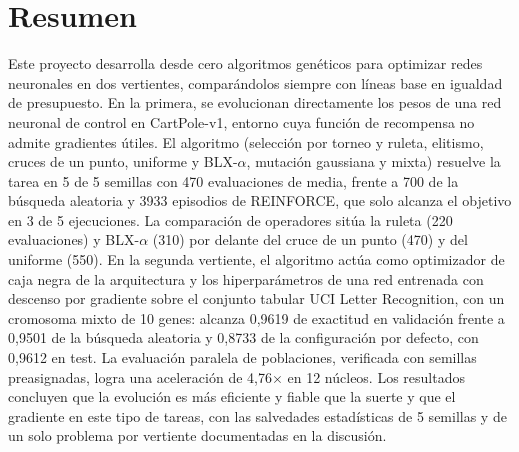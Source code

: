 \section{Resumen}

Este proyecto desarrolla desde cero algoritmos genéticos para optimizar redes neuronales en dos vertientes, comparándolos siempre con líneas base en igualdad de presupuesto. En la primera, se evolucionan directamente los pesos de una red neuronal de control en CartPole-v1, entorno cuya función de recompensa no admite gradientes útiles. El algoritmo (selección por torneo y ruleta, elitismo, cruces de un punto, uniforme y BLX-$\alpha$, mutación gaussiana y mixta) resuelve la tarea en 5 de 5 semillas con 470 evaluaciones de media, frente a 700 de la búsqueda aleatoria y 3933 episodios de REINFORCE, que solo alcanza el objetivo en 3 de 5 ejecuciones. La comparación de operadores sitúa la ruleta (220 evaluaciones) y BLX-$\alpha$ (310) por delante del cruce de un punto (470) y del uniforme (550). En la segunda vertiente, el algoritmo actúa como optimizador de caja negra de la arquitectura y los hiperparámetros de una red entrenada con descenso por gradiente sobre el conjunto tabular UCI Letter Recognition, con un cromosoma mixto de 10 genes: alcanza 0,9619 de exactitud en validación frente a 0,9501 de la búsqueda aleatoria y 0,8733 de la configuración por defecto, con 0,9612 en test. La evaluación paralela de poblaciones, verificada con semillas preasignadas, logra una aceleración de 4,76$\times$ en 12 núcleos. Los resultados concluyen que la evolución es más eficiente y fiable que la suerte y que el gradiente en este tipo de tareas, con las salvedades estadísticas de 5 semillas y de un solo problema por vertiente documentadas en la discusión.
